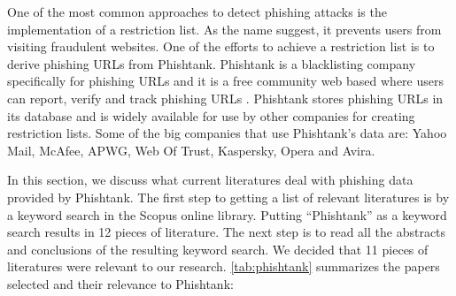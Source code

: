 One of the most common approaches to detect phishing attacks is the
implementation of a restriction list. As the name suggest, it prevents
users from visiting fraudulent websites. One of the efforts to achieve
a restriction list is to derive phishing URLs from Phishtank. Phishtank
is a blacklisting company specifically for phishing URLs and it is
a free community web based where users can report, verify and track
phishing URLs \citep{phishtank}. Phishtank stores phishing URLs in
its database and is widely available for use by other companies for
creating restriction lists. Some of the big companies that use Phishtank's
data are: Yahoo Mail, McAfee, APWG, Web Of Trust, Kaspersky, Opera
and Avira. 

In this section, we discuss what current literatures deal with phishing
data provided by Phishtank. The first step to getting a list of relevant
literatures is by a keyword search in the Scopus online library. Putting
``Phishtank'' as a keyword search results in 12 pieces of literature.
The next step is to read all the abstracts and conclusions of the
resulting keyword search. We decided that 11 pieces of literatures
were relevant to our research. \autoref{tab:phishtank} summarizes
the papers selected and their relevance to Phishtank:


